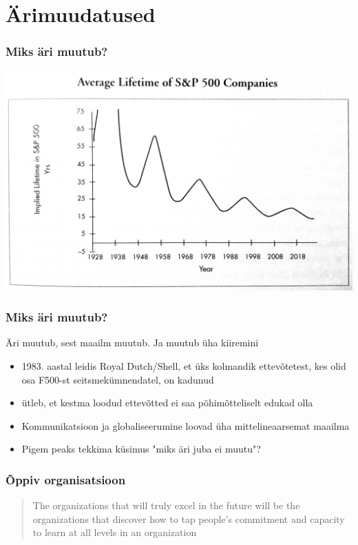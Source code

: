 \section{Ärimuudatused}
\begin{frame}[fragile]
  \frametitle{Miks äri muutub?}
  	\begin{center}
			\includegraphics[width=.85\textwidth]{sp500.png}
	\end{center}
	\cite{foster2011creative}
\end{frame}

\begin{frame}[fragile]
  \frametitle{Miks äri muutub?}
  Äri muutub, sest maailm muutub. Ja muutub üha kiiremini
	\begin{itemize}
		\item 1983. aastal leidis Royal Dutch/Shell, et üks kolmandik ettevõtetest, kes olid osa F500-st seitsmekümnendatel, on kadunud \citep{senge19905th}
		\item \cite{foster2011creative} ütleb, et kestma loodud ettevõtted ei saa põhimõtteliselt edukad olla
		\item Kommunikatsioon ja globaliseerumine loovad üha mittelineaarsemat maailma
		\item Pigem peaks tekkima küsimus "miks äri juba ei muutu"?
	\end{itemize}
\end{frame}

\begin{frame}[fragile]
  \frametitle{Õppiv organisatsioon}
  \begin{center}
  	\begin{quote}
		The organizations that will truly excel in the future will be the organizations that discover how to tap people's commitment and capacity to learn at all levels in an organization
	\end{quote}
  \end{center}
  \cite{senge19905th}
\end{frame}

